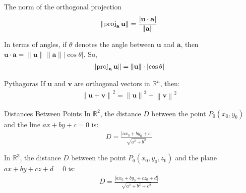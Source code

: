 \documentclass[\main/notes.tex]{subfiles}
\begin{document}
			\pagebreak
			\begin{definition}{The norm of the orthogonal projection}
				\begin{align*}
					\left\lVert \operatorname{proj}_{\mathbf{a}}\mathbf{u}\right\rVert = \frac{\left\lvert \mathbf{u} \cdot \mathbf{a}\right\rvert }{\left\lVert \mathbf{a}\right\rVert}
				\end{align*}

				In terms of angles, if $\theta$ denotes the angle between $\mathbf{u}$ and $\mathbf{a}$, then $\mathbf{u} \cdot \mathbf{a} = \left\lVert \mathbf{u}\right\rVert \left\lVert \mathbf{a}\right\rVert \left\lvert \cos \theta\right\rvert $.
				So,
				\begin{align*}
					\left\lVert \operatorname{proj}_{\mathbf{a}}\mathbf{u}\right\rVert = \left\lVert \mathbf{u}\right\rVert \cdot \left\lvert \cos \theta\right\rvert 
				\end{align*}
			\end{definition}
			\begin{theorem}{Pythagoras}
				If $\mathbf{u}$ and $\mathbf{v}$ are orthogonal vectors in $\mathbb{R}^{n}$, then:
				\begin{align*}
					\left\lVert \mathbf{u} + \mathbf{v}\right\rVert^{2} = \left\lVert \mathbf{u}\right\rVert^{2} + \left\lVert \mathbf{v}\right\rVert^{2}  
				\end{align*}
			\end{theorem}
			\begin{definition}{Distances Between Points}
				In $\mathbb{R}^{2}$, the distance $D$ between the point $P_{0}(x_{0}, y_{0})$ and the line $ax + by + c = 0$ is:
				\begin{align*}
					D = \frac{\left\lvert ax_{0} + by_{0} + c\right\rvert }{\sqrt{a^{2} + b^{2}}}
				\end{align*}

				In $\mathbb{R}^{3}$, the distance $D$ between the point $P_{0}(x_{0}, y_{0}, z_{0})$ and the plane $ax + by + cz + d = 0$ is:
				\begin{align*}
					D = \frac{\left\lvert ax_{0} + by_{0} + cz_{0} + d\right\rvert }{\sqrt{a^{2} + b^{2} + c^{2}}}
				\end{align*}
			\end{definition}
\end{document}

